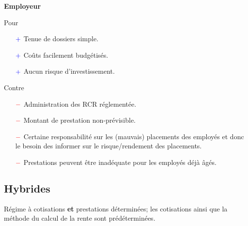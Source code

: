 \documentclass[10pt, french]{article}
\begin{document}
\begin{multicols*}{3}
\begin{center}
	\textbf{Employeur}
\end{center}
Pour
\begin{itemize}
	\item[$\color{blue}+$]	Tenue de dossiers simple.
	\item[$\color{blue}+$]	Coûts facilement budgétisés.
	\item[$\color{blue}+$]	Aucun risque d'investissement.
\end{itemize}

Contre
\begin{itemize}
	\item[$\color{red}-$]	Administration des RCR réglementée.
	\item[$\color{red}-$]	Montant de prestation non-prévisible.
	\item[$\color{red}-$]	Certaine responsabilité sur les (mauvais) placements des employés et donc le besoin des informer sur le risque/rendement des placements.
	\item[$\color{red}-$]	Prestations peuvent être inadéquate pour les employés déjà âgés.
\end{itemize}

\newpage

\subsection{Hybrides}

\begin{definitionNOHFILL}[Description]
Régime à cotisations \textbf{et} prestations déterminées; les cotisations ainsi que la méthode du calcul de la rente sont prédéterminées.
\end{definitionNOHFILL}


\end{multicols*}
\end{document}
